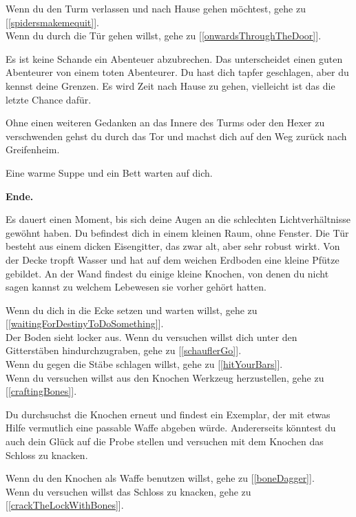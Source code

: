 Wenn du den Turm verlassen und nach Hause gehen möchtest, gehe zu [\ref{spidersmakemequit}].
\\Wenn du durch die Tür gehen willst, gehe zu [\ref{onwardsThroughTheDoor}].


Es ist keine Schande ein Abenteuer abzubrechen. Das unterscheidet einen guten Abenteurer von einem toten Abenteurer. Du hast dich tapfer geschlagen, aber du kennst deine Grenzen. Es wird Zeit nach Hause zu gehen, vielleicht ist das die letzte Chance dafür.

Ohne einen weiteren Gedanken an das Innere des Turms oder den Hexer zu verschwenden gehst du durch das Tor und machst dich auf den Weg zurück nach Greifenheim.

Eine warme Suppe und ein Bett warten auf dich.

\textbf{Ende.}


Es dauert einen Moment, bis sich deine Augen an die schlechten Lichtverhältnisse gewöhnt haben. Du befindest dich in einem kleinen Raum, ohne Fenster. Die Tür besteht aus einem dicken Eisengitter, das zwar alt, aber sehr robust wirkt. Von der Decke tropft Wasser und hat auf dem weichen Erdboden eine kleine Pfütze gebildet. An der Wand findest du einige kleine Knochen, von denen du nicht sagen kannst zu welchem Lebewesen sie vorher gehört hatten.

Wenn du dich in die Ecke setzen und warten willst, gehe zu [\ref{waitingForDestinyToDoSomething}].
\\Der Boden sieht locker aus. Wenn du versuchen willst dich unter den Gitterstäben hindurchzugraben, gehe zu [\ref{schauflerGo}].
\\Wenn du gegen die Stäbe schlagen willst, gehe zu [\ref{hitYourBars}].
\\Wenn du versuchen willst aus den Knochen Werkzeug herzustellen, gehe zu [\ref{craftingBones}].


Du durchsuchst die Knochen erneut und findest ein Exemplar, der mit etwas Hilfe vermutlich eine passable Waffe abgeben würde. Andererseits könntest du auch dein Glück auf die Probe stellen und versuchen mit dem Knochen das Schloss zu knacken.

Wenn du den Knochen als Waffe benutzen willst, gehe zu [\ref{boneDagger}].
\\Wenn du versuchen willst das Schloss zu knacken, gehe zu [\ref{crackTheLockWithBones}].

